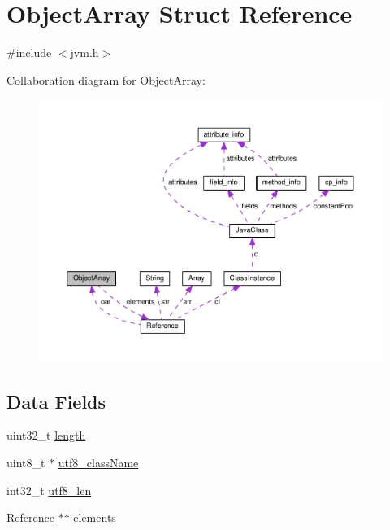 \hypertarget{structObjectArray}{}\section{Object\+Array Struct Reference}
\label{structObjectArray}


{\ttfamily \#include $<$jvm.\+h$>$}



Collaboration diagram for Object\+Array\+:\nopagebreak
\begin{figure}[H]
\begin{center}
\leavevmode
\includegraphics[width=350pt]{structObjectArray__coll__graph}
\end{center}
\end{figure}
\subsection*{Data Fields}
\begin{DoxyCompactItemize}
\item 
uint32\+\_\+t \hyperlink{structObjectArray_aa2263f92dcbf379ff869c4eefaabc715}{length}
\item 
uint8\+\_\+t $\ast$ \hyperlink{structObjectArray_a6faf7707737d9d8f5d6261334b2a5a9a}{utf8\+\_\+class\+Name}
\item 
int32\+\_\+t \hyperlink{structObjectArray_ad5fe6b2b494654afd05b58836b308d21}{utf8\+\_\+len}
\item 
\hyperlink{structReference}{Reference} $\ast$$\ast$ \hyperlink{structObjectArray_a0f945929c1656e6c0fd521bb53618f78}{elements}
\end{DoxyCompactItemize}


